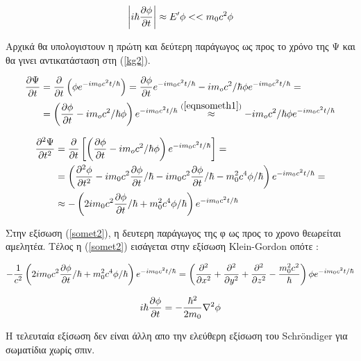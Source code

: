 \begin{equation} 
  \left| i\hbar\frac{\partial \phi}{\partial t} \right| \approx E' \phi << m_0 c^2\phi
  \label{eqnsometh1}
\end{equation}

Αρχικά θα υπολογιστουν η πρώτη και δεύτερη παράγωγος ως προς το χρόνο της Ψ και θα γινει αντικατάσταση στη (\ref{kg2}).

\begin{equation}
  \begin{split}
  \frac{\partial \Psi}{\partial t} &= \frac{\partial }{\partial t} \left(  \phi e^{-im_0c^2t/\hbar } \right)  = \frac{\partial \phi}{\partial t} e^{-im_0c^2t/\hbar }  -im_oc^2/\hbar \phi e^{-im_0c^2t/\hbar }=
  \\&=\left(  \frac{\partial \phi}{\partial t}   -im_oc^2/\hbar \phi\right)  e^{-im_0c^2t/\hbar }   \stackrel{(\ref{eqnsometh1})}{\approx}  -im_oc^2/\hbar \phi e^{-im_0c^2t/\hbar }
  \end{split}
  \label{somet1}
\end{equation}

\begin{equation}
  \begin{split}
  \frac{\partial ^2 \Psi}{\partial t^2} &= \frac{\partial }{\partial t} \left[  \left(  \frac{\partial \phi}{\partial t}-im_oc^2/\hbar \phi \right)  e^{-im_0c^2t/\hbar }  \right] =
  \\&=\left(  \frac{\partial ^2\phi}{\partial t^2}-im_0c^2\frac{\partial \phi}{\partial t}/\hbar -im_0c^2\frac{\partial \phi}{\partial t}/\hbar- m_0^2c^4\phi/\hbar \right)  e^{-im_0c^2t/\hbar } =
  \\& \approx -\left(  2im_0c^2\frac{\partial \phi}{\partial t}/\hbar+ m_0^2c^4\phi/\hbar \right)  e^{-im_0c^2t/\hbar } 
  \end{split}
  \label{somet2}
\end{equation}

Στην εξίσωση (\ref{somet2}), η δευτερη παράγωγος της φ ως προς το χρονο θεωρείται αμελητέα. Τέλος η (\ref{somet2}) εισάγεται στην εξίσωση \textlatin{Klein-Gordon} οπότε : 

\[
-\frac{1}{c^2}\left(  2im_0c^2\frac{\partial \phi}{\partial t}/\hbar+ m_0^2c^4\phi/\hbar \right)  e^{-im_0c^2t/\hbar }  = \left(  \frac{\partial ^2}{\partial x^2}+\frac{\partial ^2}{\partial y^2}+\frac{\partial ^2}{\partial z^2}- \frac{m_0^2c^2 }{\hbar}\right)  \phi e^{-im_0c^2t/\hbar }
\]
\vspace{0.5cm}
\begin{mdframed}
  \[   
  i\hbar\frac{\partial \phi}{\partial t}  = -\frac{\hbar^2}{2m_0}\nabla^2 \phi
  \]
\end{mdframed}
\vspace{0.5cm}
Η τελευταία εξίσωση δεν είναι άλλη απο την ελεύθερη εξίσωση του \textlatin{Schr\"ondiger} για σωματίδια χωρίς σπιν.
